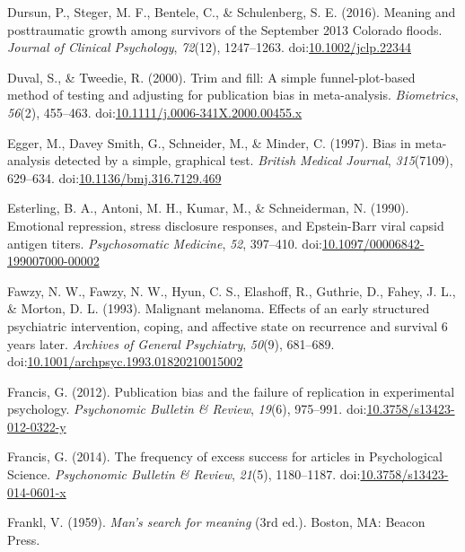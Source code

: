 \documentclass[man]{apa6}
\theoremstyle{definition}
\theoremstyle{definition}
\theoremstyle{definition}
\theoremstyle{remark}
\begin{document}
\hypertarget{ref-Dursun2016}{}
Dursun, P., Steger, M. F., Bentele, C., \& Schulenberg, S. E. (2016).
Meaning and posttraumatic growth among survivors of the September 2013
Colorado floods. \emph{Journal of Clinical Psychology}, \emph{72}(12),
1247--1263.
doi:\href{https://doi.org/10.1002/jclp.22344}{10.1002/jclp.22344}

\hypertarget{ref-Duval2000}{}
Duval, S., \& Tweedie, R. (2000). Trim and fill: A simple
funnel-plot-based method of testing and adjusting for publication bias
in meta-analysis. \emph{Biometrics}, \emph{56}(2), 455--463.
doi:\href{https://doi.org/10.1111/j.0006-341X.2000.00455.x}{10.1111/j.0006-341X.2000.00455.x}

\hypertarget{ref-Egger1997}{}
Egger, M., Davey Smith, G., Schneider, M., \& Minder, C. (1997). Bias in
meta-analysis detected by a simple, graphical test. \emph{British
Medical Journal}, \emph{315}(7109), 629--634.
doi:\href{https://doi.org/10.1136/bmj.316.7129.469}{10.1136/bmj.316.7129.469}

\hypertarget{ref-Esterling1990}{}
Esterling, B. A., Antoni, M. H., Kumar, M., \& Schneiderman, N. (1990).
Emotional repression, stress disclosure responses, and Epstein-Barr
viral capsid antigen titers. \emph{Psychosomatic Medicine}, \emph{52},
397--410.
doi:\href{https://doi.org/10.1097/00006842-199007000-00002}{10.1097/00006842-199007000-00002}

\hypertarget{ref-Fawzy1993}{}
Fawzy, N. W., Fawzy, N. W., Hyun, C. S., Elashoff, R., Guthrie, D.,
Fahey, J. L., \& Morton, D. L. (1993). Malignant melanoma. Effects of an
early structured psychiatric intervention, coping, and affective state
on recurrence and survival 6 years later. \emph{Archives of General
Psychiatry}, \emph{50}(9), 681--689.
doi:\href{https://doi.org/10.1001/archpsyc.1993.01820210015002}{10.1001/archpsyc.1993.01820210015002}

\hypertarget{ref-Francis2012}{}
Francis, G. (2012). Publication bias and the failure of replication in
experimental psychology. \emph{Psychonomic Bulletin \& Review},
\emph{19}(6), 975--991.
doi:\href{https://doi.org/10.3758/s13423-012-0322-y}{10.3758/s13423-012-0322-y}

\hypertarget{ref-Francis2014}{}
Francis, G. (2014). The frequency of excess success for articles in
Psychological Science. \emph{Psychonomic Bulletin \& Review},
\emph{21}(5), 1180--1187.
doi:\href{https://doi.org/10.3758/s13423-014-0601-x}{10.3758/s13423-014-0601-x}

\hypertarget{ref-Frankl1959}{}
Frankl, V. (1959). \emph{Man's search for meaning} (3rd ed.). Boston,
MA: Beacon Press.
\end{document}
